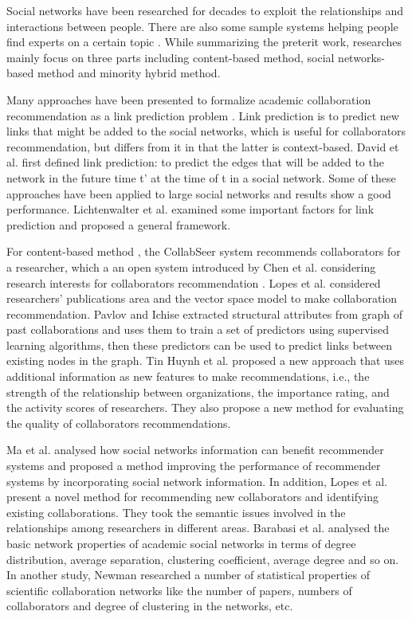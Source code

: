\documentclass[review]{elsarticle}
\begin{document}
Social networks have been researched for decades to exploit the relationships and interactions between people. There are also some sample systems helping people find experts on a certain topic \cite{freyne2010social}. While summarizing the preterit work, researches \cite{lee2011recommending} mainly focus on three parts including content-based method, social networks-based method and minority hybrid method.

Many approaches have been presented to formalize academic collaboration recommendation as a link prediction problem \cite{chen2012discovering} \cite{sun2011co}. Link prediction is to predict new links that might be added to the social networks, which is useful for collaborators recommendation, but differs from it in that the latter is context-based. David et al. \cite{liben2007link} first defined link prediction: to predict the edges that will be added to the network in the future time t' at the time of t in a social network. Some of these approaches have been applied to large social networks and results show a good performance. Lichtenwalter et al. \cite{lichtenwalter2010new} examined some important factors for link prediction and proposed a general framework.

For content-based method \cite{balog2007finding} \cite{gollapalli2012similar}, the CollabSeer system recommends collaborators for a researcher, which a an open system introduced by Chen et al. considering research interests for collaborators recommendation \cite{chen2011collabseer}. Lopes et al. \cite{lopes2010collaboration} considered researchers' publications area and the vector space model to make collaboration recommendation. Pavlov and Ichise \cite{pavlov2007finding} extracted structural attributes from graph of past collaborations and uses them to train a set of predictors using supervised learning algorithms, then these predictors can be used to predict links between existing nodes in the graph. Tin Huynh et al. \cite{huynh2013trend} proposed a new approach that uses additional information as new features to make recommendations, i.e., the strength of the relationship between organizations, the importance rating, and the activity scores of researchers. They also propose a new method for evaluating the quality of collaborators recommendations.

Ma et al. \cite{ma2011recommender} analysed how social networks information can benefit recommender systems and proposed a method improving the performance of recommender systems by incorporating social network information. In addition, Lopes et al. \cite{lopes2010collaboration} present a novel method for recommending new collaborators and identifying existing collaborations. They took the semantic issues involved in the relationships among researchers in different areas. Barabasi et al. \cite{barabasi2002evolution} analysed the basic network properties of academic social networks in terms of degree distribution, average separation, clustering coefficient, average degree and so on. In another study, Newman researched a number of statistical properties of scientific collaboration networks like the number of papers, numbers of collaborators and degree of clustering in the networks, etc.
\end{document}
